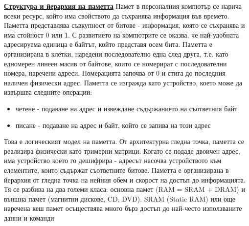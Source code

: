 \documentclass{article}
\begin{document}
\textbf{\underline{Структура и йерархия на паметта}} \newline\newline
Памет в персоналния компютър се нарича всеки ресурс, който има свойството да съхранява информация във времето. Паметта представлява
съвкупност от битове - информация, която се съхранява и има стойност $0$ или $1$. С развитието на компютрите се оказва, че
най-удобната адресируема единица е байтът, който представя осем бита. Паметта е организирана в клетки, наредени последователно
една след друга, т.е. като едномерен линеен масив от байтове, които се номерират с последователни номера, наречени адреси.
Номерацията започва от 0 и стига до последния наличен физически адрес. Паметта се изгражда като устройство, което може да извършва
следните операции:
\begin{itemize}
    \item четене - подаване на адрес и извеждане съдържанието на съответния байт
    \item писане - подаване на адрес и байт, който се запива на този адрес
\end{itemize}
Това е логическият модел на паметта. От архитектурна гледна точка, паметта се реализира физически като тримерни матрици. Когато
се подаде двоичен адрес, има устройство което го дешифрира - адресът насочва устройството към елементите, които съдържат съответните
битове.
Паметта е организирана в йерархия от гледна точка на нейния обем и скорост на достъп до информацията. Тя се разбива на два
големи класа: основна памет (RAM = SRAM + DRAM) и външна памет (магнитни дискове, CD, DVD).
SRAM (Static RAM) или още наречена кеш памет осъществява много бърз достъп до най-често използваните данни и команди
\end{document}
